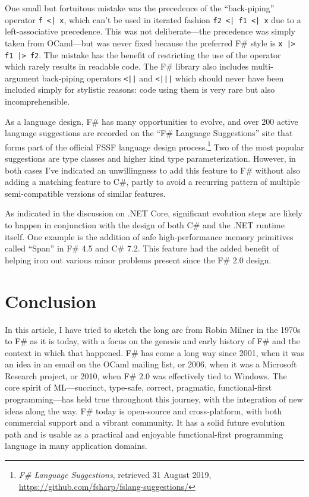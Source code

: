 \documentclass[acmsmall]{acmart}\settopmatter{}
\begin{document}
One small but fortuitous mistake was the precedence of the “back-piping”
operator \verb$f <| x$, which can’t be used in iterated fashion \verb$f2 <| f1 <| x$ due to
a left-associative precedence. This was not deliberate---the precedence was simply
taken from OCaml---but was never fixed because the preferred F\# style is  \verb$x |> f1 |> f2$. The
mistake has the benefit of restricting the use of the operator which rarely results in readable code. The F\# library also includes
multi-argument back-piping operators \verb$<||$ and \verb$<|||$ which should never have been included simply for
stylistic reasons: code using them is very rare but also incomprehensible.

As a language design, F\# has many opportunities to evolve, and over 200 active language
suggestions are recorded on the “F\# Language Suggestions” site that forms part of the
official FSSF language design process.\footnote{\textit{F\# Language Suggestions}, retrieved 31 August 2019, \url{https://github.com/fsharp/fslang-suggestions/}}
Two of the most popular suggestions are type classes
and higher kind type parameterization. However, in both cases I’ve indicated an unwillingness
to add this feature to F\# without also adding a matching feature to C\#, partly to avoid a
recurring pattern of multiple semi-compatible versions of similar features.

As indicated in the discussion on .NET Core, significant evolution steps are likely to happen in
conjunction with the design of both C\# and the .NET runtime itself.  One example is the addition
of safe high-performance memory primitives called “Span” in F\# 4.5 and C\# 7.2.  This feature
had the added benefit of helping iron out various minor problems present since the F\# 2.0 design.

\section*{Conclusion}

In this article, I have tried to sketch the long arc from Robin Milner in the 1970s to F\# as it
is today, with a focus on the genesis and early history of F\# and the context in which
that happened. F\# has come a long way since 2001, when it was an idea in
an email on the OCaml mailing list, or 2006, when it was a Microsoft Research project,
or 2010, when F\# 2.0 was effectively tied to Windows. The core spirit of ML---succinct,
type-safe, correct, pragmatic, functional-first programming---has held true throughout
this journey, with the integration of new ideas along the way.  F\# today is open-source
and cross-platform, with both commercial support and a vibrant community. It has a solid future
evolution path and is usable as a practical and enjoyable functional-first programming language in many application domains.  
\end{document}
